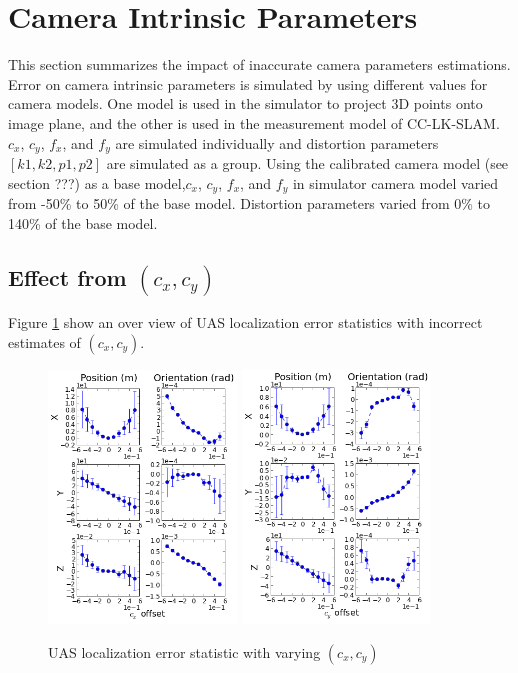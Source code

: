 \section{Camera Intrinsic Parameters}
This section summarizes the impact of inaccurate camera parameters 
estimations. Error on camera intrinsic parameters is simulated by using 
different values for camera models. One model is used in the simulator 
to project 3D points onto image plane, and the other is used in the 
measurement model of CC-LK-SLAM. $c_{x}$, $c_{y}$, $f_{x}$, and 
$f_{y}$ are simulated individually and distortion parameters $[k1, 
k2, p1, p2]$ are simulated as a group. Using the calibrated camera 
model (see section ???) as a base model,$ c_{x}$, $c_{y}$, $f_{x}
$, and $f_{y}$ in simulator camera model varied from -50\% to 50\% of 
the base model. Distortion parameters varied from 0\% to 140\% of the 
base model. 

\subsection{Effect from $(c_{x}, c_{y})$}

Figure \ref{fig:simfig34-35} show an over view of UAS localization
error statistics with incorrect estimates of $ (c_{x}, c_{y})$.

\begin{figure}[h]
  \centering
  \includegraphics[width=5cm, keepaspectratio=true]{./Figures/SimulationFigures/Figure34.png}
  \includegraphics[width=5cm, keepaspectratio=true]{./Figures/SimulationFigures/Figure35.png}
  \caption{UAS localization error statistic with varying $(c_x, c_y)$}
  \label{fig:simfig34-35}
\end{figure}

